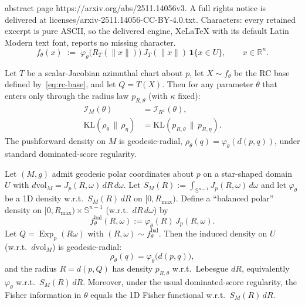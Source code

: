 \documentclass[10pt,a4paper]{amsart}
\newcommand{\Exp}{\operatorname{Exp}}
\newcommand{\RR}{\mathbb{R}}
\newcommand{\SSS}{\mathbb{S}}
\begin{document}
abstract page https://arxiv.org/abs/2511.14056v3. A full rights notice is delivered at licenses/arxiv-2511.14056-CC-BY-4.0.txt. Characters: every retained excerpt is pure ASCII, so the delivered engine, XeLaTeX with its default Latin Modern text font, reports no missing character.
\begin{equation}
  f_\theta(x)
  \;:=\;
  \varphi_\theta\!\bigl(R_T(\|x\|)\bigr)\,J_T(\|x\|)\,\mathbf{1}\{x\in U\},
  \qquad x\in\RR^n.
  \label{eq:rc-base}
\end{equation}

\begin{theorem}
\label{thm:rc-invariances}
Let $T$ be a scalar-Jacobian azimuthal chart about $p$, let $X\sim f_\theta$
be the RC base defined by~\eqref{eq:rc-base}, and let $Q=T(X)$.
Then for any parameter $\theta$ that enters only through the radius law
$p_{R,\theta}$ (with $\kappa$ fixed):
\begin{align}
\mathcal{I}_M(\theta) &= \mathcal{I}_{R^1}(\theta), \label{eq:fisher-eq}\\
\mathrm{KL}(\rho_\theta\,\|\,\rho_\eta) &= \mathrm{KL}(p_{R,\theta}\,\|\,p_{R,\eta}).
\label{eq:kl-eq}
\end{align}
The pushforward density on $M$ is geodesic-radial,
$\rho_\theta(q)=\varphi_\theta(d(p,q))$,
under standard dominated-score regularity.
\end{theorem}

\begin{theorem}
\label{thm:balanced-polar}
Let $(M,g)$ admit geodesic polar coordinates about $p$ on a star-shaped domain $U$ with
$d\mathrm{vol}_M=J_p(R,\omega)\,dR\,d\omega$.
Let $S_M(R):=\int_{\SSS^{n-1}}J_p(R,\omega)\,d\omega$ and let $\varphi_\theta$ be a 1D density
w.r.t.\ $S_M(R)\,dR$ on $[0,R_{\max})$.
Define a ``balanced polar'' density on $[0,R_{\max})\times\SSS^{n-1}$ (w.r.t.\ $dR\,d\omega$) by
\[
f^{\mathrm{bal}}_\theta(R,\omega) := \varphi_\theta(R)\,J_p(R,\omega).
\]
Let $Q=\Exp_p(R\omega)$ with $(R,\omega)\sim f^{\mathrm{bal}}_\theta$. Then the induced density on $U$
(w.r.t.\ $d\mathrm{vol}_M$) is geodesic-radial:
\[
\rho_\theta(q)=\varphi_\theta\!\bigl(d(p,q)\bigr),
\]
and the radius $R=d(p,Q)$ has density $p_{R,\theta}$ w.r.t.\ Lebesgue $dR$, equivalently $\varphi_\theta$ w.r.t.\ $S_M(R)\,dR$.
Moreover, under the usual dominated-score regularity, the Fisher information in $\theta$ equals
the 1D Fisher functional w.r.t.\ $S_M(R)\,dR$.
\end{theorem}
\end{document}
